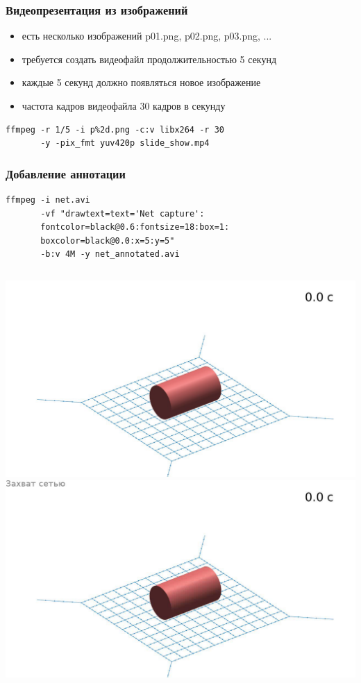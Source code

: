 \documentclass[11pt, compress]{beamer}
\begin{document}
\begin{frame}[c,fragile]
\frametitle{Видеопрезентация из изображений}
\begin{itemize}
\item есть несколько изображений p01.png, p02.png, p03.png, ...
\item требуется создать видеофайл продолжительностью 5 секунд  
\item каждые 5 секунд должно появляться новое изображение
\item частота кадров видеофайла 30 кадров в секунду
\end{itemize}
\begin{lstlisting}
ffmpeg -r 1/5 -i p%2d.png -c:v libx264 -r 30 
       -y -pix_fmt yuv420p slide_show.mp4 
\end{lstlisting}
\end{frame}

\begin{frame}[c,fragile]
\frametitle{Добавление аннотации}
\begin{lstlisting}
ffmpeg -i net.avi 
       -vf "drawtext=text='Net capture':
       fontcolor=black@0.6:fontsize=18:box=1:
       boxcolor=black@0.0:x=5:y=5" 
       -b:v 4M -y net_annotated.avi 
\end{lstlisting}  
\begin{columns}
\includegraphics[width=1\textwidth]{net_wo_annotation.png}
\includegraphics[width=1\textwidth]{net_with_annotation.png}
\end{columns}     
\end{frame}
\end{document}

